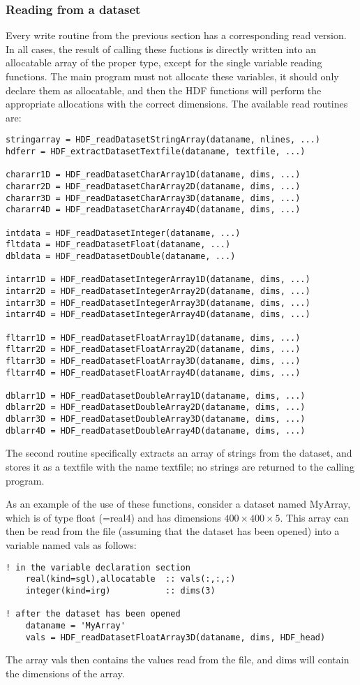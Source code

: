 \documentclass[DIV=calc, paper=letter, fontsize=11pt]{scrartcl}	 %
\begin{document}
\subsubsection{Reading from a dataset}
Every write routine from the previous section has a corresponding read version.  In 
all cases, the result of calling these fuctions is directly written into an allocatable 
array of the proper type, except for the single variable reading functions.  
The main program must not allocate these variables, it should
only declare them as allocatable, and then the HDF functions will perform the appropriate
allocations with the correct dimensions. The available read routines are:
\begin{verbatim}
stringarray = HDF_readDatasetStringArray(dataname, nlines, ...)
hdferr = HDF_extractDatasetTextfile(dataname, textfile, ...) 

chararr1D = HDF_readDatasetCharArray1D(dataname, dims, ...) 
chararr2D = HDF_readDatasetCharArray2D(dataname, dims, ...) 
chararr3D = HDF_readDatasetCharArray3D(dataname, dims, ...) 
chararr4D = HDF_readDatasetCharArray4D(dataname, dims, ...) 

intdata = HDF_readDatasetInteger(dataname, ...)
fltdata = HDF_readDatasetFloat(dataname, ...)
dbldata = HDF_readDatasetDouble(dataname, ...) 

intarr1D = HDF_readDatasetIntegerArray1D(dataname, dims, ...) 
intarr2D = HDF_readDatasetIntegerArray2D(dataname, dims, ...) 
intarr3D = HDF_readDatasetIntegerArray3D(dataname, dims, ...) 
intarr4D = HDF_readDatasetIntegerArray4D(dataname, dims, ...) 

fltarr1D = HDF_readDatasetFloatArray1D(dataname, dims, ...) 
fltarr2D = HDF_readDatasetFloatArray2D(dataname, dims, ...) 
fltarr3D = HDF_readDatasetFloatArray3D(dataname, dims, ...) 
fltarr4D = HDF_readDatasetFloatArray4D(dataname, dims, ...) 

dblarr1D = HDF_readDatasetDoubleArray1D(dataname, dims, ...)
dblarr2D = HDF_readDatasetDoubleArray2D(dataname, dims, ...)
dblarr3D = HDF_readDatasetDoubleArray3D(dataname, dims, ...)
dblarr4D = HDF_readDatasetDoubleArray4D(dataname, dims, ...)
\end{verbatim}
The second routine specifically extracts an array of strings from the dataset, and
stores it as a textfile with the name \textsf{textfile}; no strings are returned to the 
calling program.

As an example of the use of these functions, consider a dataset named \textsf{MyArray}, which 
is of type \textsf{float} (=real4) and has dimensions $400\times 400 \times 5$.  This array can
then be read from the file (assuming that the dataset has been opened) into a variable named \textsf{vals}
as follows:
\begin{verbatim}
! in the variable declaration section
	real(kind=sgl),allocatable	:: vals(:,:,:)
	integer(kind=irg)			:: dims(3)
	
! after the dataset has been opened
	dataname = 'MyArray'
	vals = HDF_readDatasetFloatArray3D(dataname, dims, HDF_head)
\end{verbatim}
The array \textsf{vals} then contains the values read from the file, and \textsf{dims} will
contain the dimensions of the array.
\end{document}
